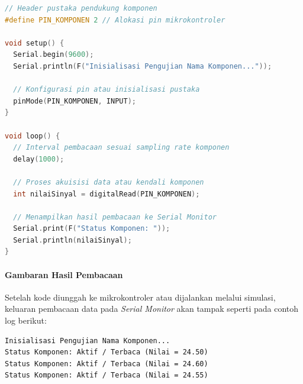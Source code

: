 \begin{lstlisting}[language=C++, caption={Kode program pengujian Nama Komponen pada mikrokontroler}, label={lst:nama_komponen_code}]
// Header pustaka pendukung komponen
#define PIN_KOMPONEN 2 // Alokasi pin mikrokontroler

void setup() {
  Serial.begin(9600);
  Serial.println(F("Inisialisasi Pengujian Nama Komponen..."));

  // Konfigurasi pin atau inisialisasi pustaka
  pinMode(PIN_KOMPONEN, INPUT);
}

void loop() {
  // Interval pembacaan sesuai sampling rate komponen
  delay(1000);

  // Proses akuisisi data atau kendali komponen
  int nilaiSinyal = digitalRead(PIN_KOMPONEN);

  // Menampilkan hasil pembacaan ke Serial Monitor
  Serial.print(F("Status Komponen: "));
  Serial.println(nilaiSinyal);
}
\end{lstlisting}

\paragraph{Gambaran Hasil Pembacaan}
Setelah kode diunggah ke mikrokontroler atau dijalankan melalui simulasi, keluaran pembacaan data
pada \textit{Serial Monitor} akan tampak seperti pada contoh log berikut:

\begin{verbatim}
Inisialisasi Pengujian Nama Komponen...
Status Komponen: Aktif / Terbaca (Nilai = 24.50)
Status Komponen: Aktif / Terbaca (Nilai = 24.60)
Status Komponen: Aktif / Terbaca (Nilai = 24.55)
\end{verbatim}
